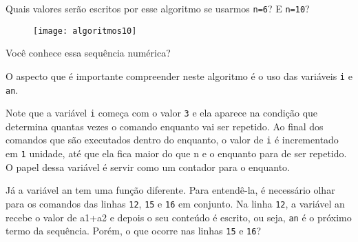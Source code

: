 Quais valores serão escritos por esse algoritmo se usarmos \verb|n=6|? E \verb|n=10|?

\begin{figure}[H]
\centering

\texttt{[image: algoritmos10]}
\end{figure}

\begin{reflection}
Você conhece essa sequência numérica?
\end{reflection}

O aspecto que é importante compreender neste algoritmo é o uso das variáveis \verb|i| e \verb|an|.

Note que a variável \verb|i| começa com o valor \verb|3| e ela aparece na condição que determina quantas vezes o comando enquanto vai ser repetido. Ao final dos comandos que são executados dentro do enquanto, o valor de \verb|i| é incrementado em \verb|1| unidade, até que ela fica maior do que n e o enquanto para de ser repetido. O papel dessa variável é servir como um contador para o enquanto.

Já a variável an tem uma função diferente. Para entendê-la, é necessário olhar para os comandos das linhas \verb|12|, \verb|15| e \verb|16| em conjunto. Na linha \verb|12|, a variável an recebe o valor de a1+a2 e depois o seu conteúdo é escrito, ou seja, \verb|an| é o próximo termo da sequência. Porém, o que ocorre nas linhas \verb|15| e \verb|16|?

